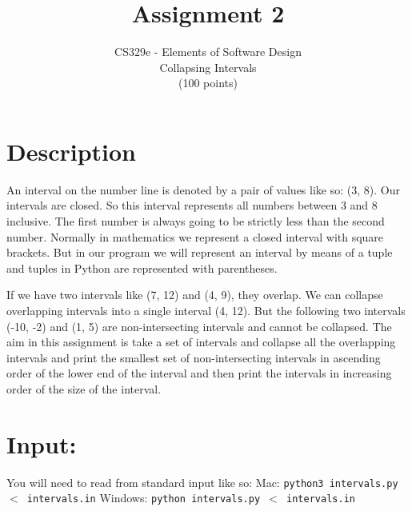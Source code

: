 \documentclass[12pt]{article}
\begin{document}
\title{Assignment 2}%
\author{CS329e - Elements of Software Design \\ %
Collapsing Intervals\\
(100 points)\\
} %

\date{\vspace{-5ex}}

\maketitle

\begin{center}



\end{center}


\section{Description}
An interval on the number line is denoted by a pair of values like so: (3, 8). Our intervals are closed. So this interval represents all
numbers between 3 and 8 inclusive. The first number is always going to be strictly less than the second number. Normally in mathematics
we represent a closed interval with square brackets. But in our program we will represent an interval by means of a tuple and tuples
in Python are represented with parentheses. 

If we have two intervals like (7, 12) and (4, 9), they overlap. We can collapse overlapping intervals into a single interval (4, 12). But the
following two intervals (-10, -2) and (1, 5) are non-intersecting intervals and cannot be collapsed.
The aim in this assignment is take a set of intervals and collapse all the overlapping intervals and print the smallest set of non-intersecting
intervals in ascending order of the lower end of the interval and then print the intervals in increasing order of the size of the interval.


\section*{Input:}
You will need to read from standard input like so:
\vspace{0.5cm}
Mac:
\texttt{python3 intervals.py $<$ intervals.in}
Windows:
\texttt{python intervals.py $<$ intervals.in}
\end{document}

